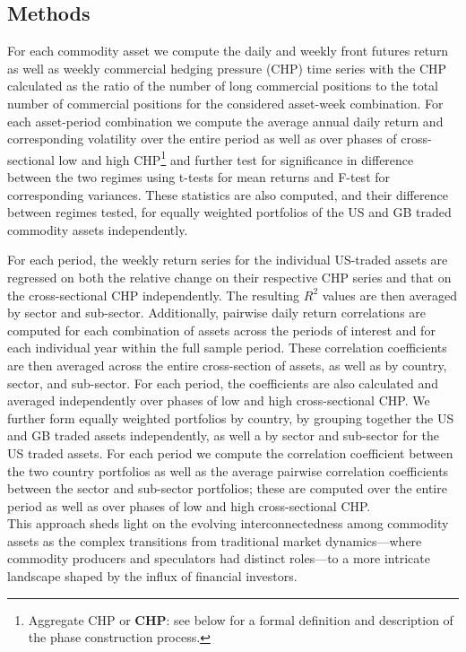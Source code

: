 \documentclass[
  authoryear,
  preprint,
  3p]{elsarticle}
\begin{document}
\subsection{Methods}\label{sec-methods}

For each commodity asset we compute the daily and weekly front futures
return as well as weekly commercial hedging pressure (CHP) time series
with the CHP calculated as the ratio of the number of long commercial
positions to the total number of commercial positions for the considered
asset-week combination. For each asset-period combination we compute the
average annual daily return and corresponding volatility over the entire
period as well as over phases of cross-sectional low and high
CHP\footnote{Aggregate CHP or \textbf{CHP}: see below for a formal
  definition and description of the phase construction process.} and
further test for significance in difference between the two regimes
using t-tests for mean returns and F-test for corresponding variances.
These statistics are also computed, and their difference between regimes
tested, for equally weighted portfolios of the US and GB traded
commodity assets independently.

For each period, the weekly return series for the individual US-traded
assets are regressed on both the relative change on their respective CHP
series and that on the cross-sectional CHP independently. The resulting
\(R^{2}\) values are then averaged by sector and sub-sector.
Additionally, pairwise daily return correlations are computed for each
combination of assets across the periods of interest and for each
individual year within the full sample period. These correlation
coefficients are then averaged across the entire cross-section of
assets, as well as by country, sector, and sub-sector. For each period,
the coefficients are also calculated and averaged independently over
phases of low and high cross-sectional CHP. We further form equally
weighted portfolios by country, by grouping together the US and GB
traded assets independently, as well a by sector and sub-sector for the
US traded assets. For each period we compute the correlation coefficient
between the two country portfolios as well as the average pairwise
correlation coefficients between the sector and sub-sector portfolios;
these are computed over the entire period as well as over phases of low
and high cross-sectional CHP.\\
This approach sheds light on the evolving interconnectedness among
commodity assets as the complex transitions from traditional market
dynamics---where commodity producers and speculators had distinct
roles---to a more intricate landscape shaped by the influx of financial
investors.
\end{document}

